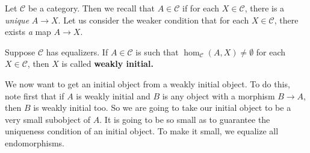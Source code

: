 Let $\mathcal{C}$ be a category. Then we recall that $A \in \mathcal{C}$ if
for each $X \in \mathcal{C}$, there is a \emph{unique} $A \to X$.
Let us consider the weaker condition that for each $ X \in \mathcal{C}$, there
exists \emph{a} map $A \to X$.

\begin{definition} Suppose $\mathcal{C}$ has equalizers.
If $A \in \mathcal{C}$ is such that $\hom_{\mathcal{C}}(A, X) \neq \emptyset$
for each $X \in \mathcal{C}$, then $X$ is called \textbf{weakly initial.}
\end{definition}

We now want to get an initial object from a weakly initial object.
To do this, note first that if $A$ is weakly initial and $B$ is any object
with a morphism $B \to A$, then $B$ is weakly initial too. So we are going to
take
our initial object to be a very small subobject of $A$.
It is going to be so small as to guarantee the uniqueness condition of an
initial object. To make it small, we equalize all endomorphisms.

